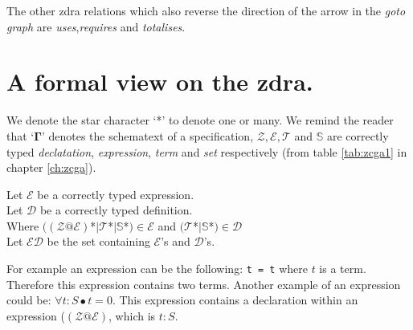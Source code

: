 The other \gls{zdra} relations which also reverse the direction of the arrow in
the \emph{goto graph} are \emph{uses},\emph{requires} and \emph{totalises}.

\section{A formal view on the \gls{zdra}.}

We denote the star character `*' to denote one or many. We remind the reader
that `$\mathbf{\Gamma}$' denotes the schematext of a specification,
$\mathcal{Z}, \mathcal{E}, \mathcal{T}$ and $\mathbb{S}$ are correctly typed
\emph{declatation}, \emph{expression}, \emph{term} and \emph{set} respectively
(from table \ref{tab:zcga1} in chapter \ref{ch:zcga}).

\begin{defin}
Let $\mathcal{E}$ be a correctly typed expression. \\ Let $\mathcal{D}$ be a
correctly typed definition. \\
Where $((\mathcal{Z}@\mathcal{E})$*$|\mathcal{T}$*$|\mathbb{S}$*$) \in
\mathcal{E}$ and $(\mathcal{T}$*$|\mathbb{S}$*$) \in \mathcal{D}$\\
Let $\mathcal{ED}$ be the set containing $\mathcal{E}$'s and $\mathcal{D}$'s.
\end{defin}

For example an expression can be the following: \verb|t = t| where $t$ is a
term. Therefore this expression contains two terms. Another example of an
expression could be: $\forall t: S \bullet t = 0$. This expression contains a
declaration within an expression ($(\mathcal{Z}@\mathcal{E})$, which is $t:S$.



